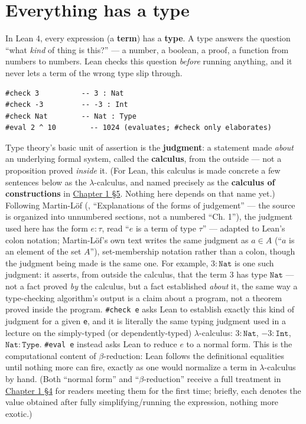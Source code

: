 \section{Everything has a type}\label{sec:01-basics:01-everything-has-a-type:1}

In Lean 4, every expression (a \textbf{term}) has a \textbf{type}. A type answers the question ``what \emph{kind} of thing is this?'' --- a number, a boolean, a proof, a function from numbers to numbers. Lean checks this question \emph{before} running anything, and it never lets a term of the wrong type slip through.

\begin{lstlisting}
#check 3          -- 3 : Nat
#check -3         -- -3 : Int
#check Nat        -- Nat : Type
#eval 2 ^ 10        -- 1024 (evaluates; #check only elaborates)
\end{lstlisting}

\begin{mathreading}

Type theory's basic unit of assertion is the \textbf{judgment}: a statement made \emph{about} an underlying formal system, called the \textbf{calculus}, from the outside --- not a proposition proved \emph{inside} it. (For Lean, this calculus is made concrete a few sentences below as the \(\lambda\)-calculus, and named precisely as the \textbf{calculus of constructions} in \hyperref[sec:01-basics:05-pi-sigma-and-coc:1]{Chapter 1 §5}. Nothing here depends on that name yet.) Following Martin-Löf (\cite{MartinLof1984}, ``Explanations of the forms of judgement'' --- the source is organized into unnumbered sections, not a numbered ``Ch. 1''), the judgment used here has the form \(e : \tau\), read ``\(e\) is a term of type \(\tau\)'' --- adapted to Lean's colon notation; Martin-Löf's own text writes the same judgment as \(a \in A\) (``\(a\) is an element of the set \(A\)''), set-membership notation rather than a colon, though the judgment being made is the same one. For example, \(3 : \mathtt{Nat}\) is one such judgment: it asserts, from outside the calculus, that the term \(3\) has type \(\mathtt{Nat}\) --- not a fact proved \emph{by} the calculus, but a fact established \emph{about} it, the same way a type-checking algorithm's output is a claim about a program, not a theorem proved inside the program. \texttt{\#check e} asks Lean to establish exactly this kind of judgment for a given \texttt{e}, and it is literally the same typing judgment used in a lecture on the simply-typed (or dependently-typed) \(\lambda\)-calculus: \(3 : \mathtt{Nat}\), \({-3} : \mathtt{Int}\), \(\mathtt{Nat} : \mathtt{Type}\). \texttt{\#eval e} instead asks Lean to reduce \(e\) to a normal form. This is the computational content of \(\beta\)-reduction: Lean follows the definitional equalities until nothing more can fire, exactly as one would normalize a term in \(\lambda\)-calculus by hand. (Both ``normal form'' and ``\(\beta\)-reduction'' receive a full treatment in \hyperref[sec:01-basics:04-terminology:1]{Chapter 1 §4} for readers meeting them for the first time; briefly, each denotes the value obtained after fully simplifying/running the expression, nothing more exotic.)

\end{mathreading}

